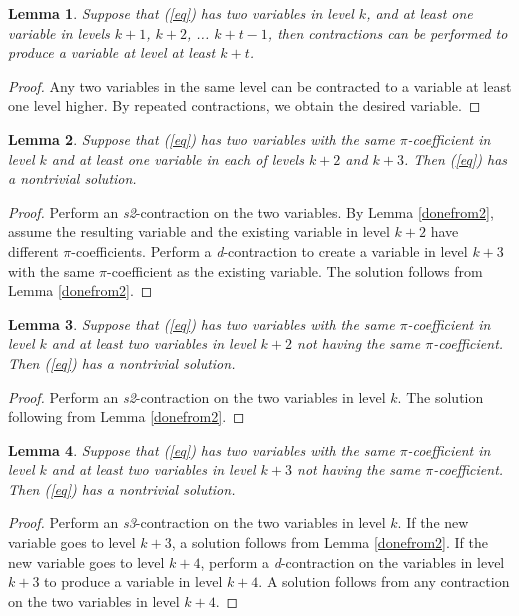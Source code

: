 \documentclass{article}
\newtheorem{lemma}{Lemma}
\begin{document}
\begin{lemma} \label{slide}
Suppose that (\ref{eq}) has two variables in level $k$, and at least one variable in levels $k+1$, $k+2$, ... $k+t-1$, then contractions can be performed to produce a variable at level at least $k+t$.
\end{lemma}
\begin{proof}
Any two variables in the same level can be contracted to a variable at least one level higher.  By repeated contractions, we obtain the desired variable.
\end{proof}

\begin{lemma} \label{doneafters2}
Suppose that (\ref{eq}) has two variables with the same $\pi$-coefficient in level $k$ and at least one variable in each of levels $k+2$ and $k+3$.  Then (\ref{eq}) has a nontrivial solution.
\end{lemma}
\begin{proof}
Perform an \textit{s2}-contraction on the two variables.  By Lemma \ref{donefrom2}, assume the resulting variable and the existing variable in level $k+2$ have different $\pi$-coefficients.  Perform a \textit{d}-contraction to create a variable in level $k+3$ with the same $\pi$-coefficient as the existing variable.  The solution follows from Lemma \ref{donefrom2}.
\end{proof}

\begin{lemma} \label{doneafters2_2}
Suppose that (\ref{eq}) has two variables with the same $\pi$-coefficient in level $k$ and at least two variables in level $k+2$ not having the same $\pi$-coefficient.  Then (\ref{eq}) has a nontrivial solution.
\end{lemma}
\begin{proof}
Perform an \textit{s2}-contraction on the two variables in level $k$.  The solution following from Lemma \ref{donefrom2}.
\end{proof}

\begin{lemma} \label{doneafters3_2}
Suppose that (\ref{eq}) has two variables with the same $\pi$-coefficient in level $k$ and at least two variables in level $k+3$ not having the same $\pi$-coefficient.  Then (\ref{eq}) has a nontrivial solution.
\end{lemma}
\begin{proof}
Perform an \textit{s3}-contraction on the two variables in level $k$.  If the new variable goes to level $k+3$, a solution follows from Lemma \ref{donefrom2}.  If the new variable goes to level $k+4$, perform a \textit{d}-contraction on the variables in level $k+3$ to produce a variable in level $k+4$.  A solution follows from any contraction on the two variables in level $k+4$.
\end{proof}
\end{document}
